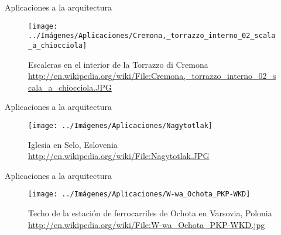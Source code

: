 \documentclass[10pt]{beamer}
\begin{document}
	\begin{frame}{Aplicaciones a la arquitectura}	
		\begin{figure}
			\centering
			\texttt{[image: ../Imágenes/Aplicaciones/Cremona,\_torrazzo\_interno\_02\_scala\_a\_chiocciola]}
			\caption{Escaleras en el interior de la Torrazzo di Cremona
			\url{http://en.wikipedia.org/wiki/File:Cremona,_torrazzo_interno_02_scala_a_chiocciola.JPG}}
			\label{fig:italia}
		\end{figure}	
	\end{frame}
	
	\begin{frame}{Aplicaciones a la arquitectura}	
		\begin{figure}
			\centering
			\texttt{[image: ../Imágenes/Aplicaciones/Nagytotlak]}
			\caption{Iglesia en Selo, Eslovenia
			\url{http://en.wikipedia.org/wiki/File:Nagytotlak.JPG}}
			\label{fig:eslovenia}
		\end{figure}	
	\end{frame}
	
	\begin{frame}{Aplicaciones a la arquitectura}	
		\begin{figure}
			\centering
			\texttt{[image: ../Imágenes/Aplicaciones/W-wa\_Ochota\_PKP-WKD]}
			\caption{Techo de la estación de ferrocarriles de Ochota en Varsovia, Polonia
				\url{http://en.wikipedia.org/wiki/File:W-wa_Ochota_PKP-WKD.jpg}}
			\label{fig:trenes}
		\end{figure}	
	\end{frame}
	
\end{document}
